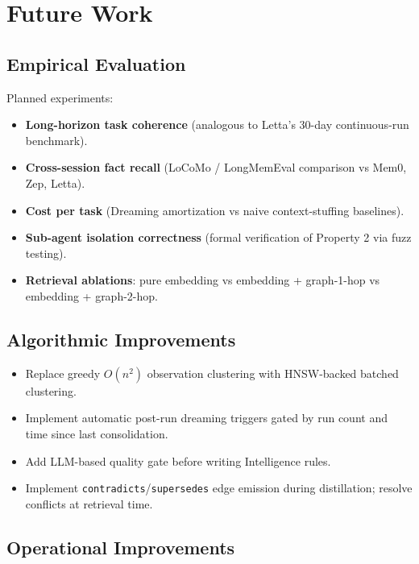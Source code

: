 \documentclass[11pt,a4paper]{article}
\theoremstyle{cortexprop}
\newcommand{\code}[1]{\texttt{#1}}
\begin{document}
\section{Future Work}
\label{sec:future}

\subsection{Empirical Evaluation}

Planned experiments:

\begin{itemize}
  \item \textbf{Long-horizon task coherence} (analogous to Letta's
  30-day continuous-run benchmark).
  \item \textbf{Cross-session fact recall} (LoCoMo / LongMemEval
  comparison vs Mem0, Zep, Letta).
  \item \textbf{Cost per task} (Dreaming amortization vs naive
  context-stuffing baselines).
  \item \textbf{Sub-agent isolation correctness} (formal verification
  of Property 2 via fuzz testing).
  \item \textbf{Retrieval ablations}: pure embedding vs embedding +
  graph-1-hop vs embedding + graph-2-hop.
\end{itemize}

\subsection{Algorithmic Improvements}

\begin{itemize}
  \item Replace greedy $O(n^2)$ observation clustering with HNSW-backed
  batched clustering.
  \item Implement automatic post-run dreaming triggers gated by run
  count and time since last consolidation.
  \item Add LLM-based quality gate before writing Intelligence rules.
  \item Implement \code{contradicts}/\code{supersedes} edge emission
  during distillation; resolve conflicts at retrieval time.
\end{itemize}

\subsection{Operational Improvements}
\end{document}

